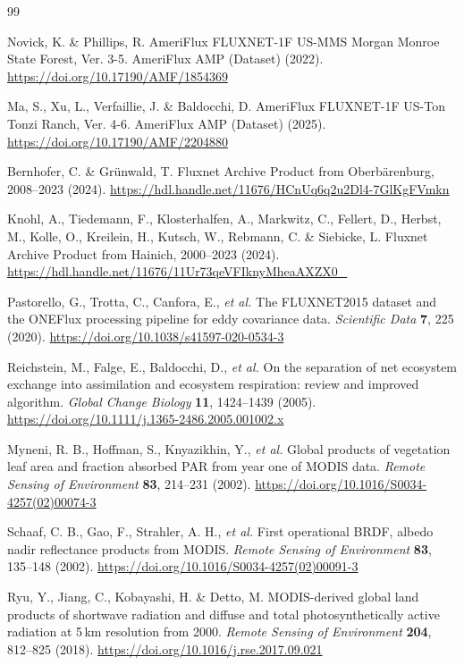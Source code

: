 \begin{thebibliography}{99}

Novick, K. \& Phillips, R.
AmeriFlux FLUXNET-1F US-MMS Morgan Monroe State Forest, Ver. 3-5. AmeriFlux AMP
(Dataset) (2022). \url{https://doi.org/10.17190/AMF/1854369}

Ma, S., Xu, L., Verfaillie, J. \& Baldocchi, D.
AmeriFlux FLUXNET-1F US-Ton Tonzi Ranch, Ver. 4-6. AmeriFlux AMP (Dataset)
(2025). \url{https://doi.org/10.17190/AMF/2204880}

Bernhofer, C. \& Gr\"unwald, T.
Fluxnet Archive Product from Oberb\"arenburg, 2008--2023 (2024).
\url{https://hdl.handle.net/11676/HCnUq6q2u2Dl4-7GlKgFVmkn}

Knohl, A., Tiedemann, F., Klosterhalfen, A., Markwitz, C., Fellert, D.,
Herbst, M., Kolle, O., Kreilein, H., Kutsch, W., Rebmann, C. \& Siebicke, L.
Fluxnet Archive Product from Hainich, 2000--2023 (2024).
\url{https://hdl.handle.net/11676/11Ur73qeVFIknyMheaAXZX0_}

Pastorello, G., Trotta, C., Canfora, E., \emph{et al.}
The FLUXNET2015 dataset and the ONEFlux processing pipeline for eddy covariance
data. \emph{Scientific Data} \textbf{7}, 225 (2020).
\url{https://doi.org/10.1038/s41597-020-0534-3}

Reichstein, M., Falge, E., Baldocchi, D., \emph{et al.}
On the separation of net ecosystem exchange into assimilation and ecosystem
respiration: review and improved algorithm. \emph{Global Change Biology}
\textbf{11}, 1424--1439 (2005).
\url{https://doi.org/10.1111/j.1365-2486.2005.001002.x}

Myneni, R. B., Hoffman, S., Knyazikhin, Y., \emph{et al.}
Global products of vegetation leaf area and fraction absorbed PAR from year one
of MODIS data. \emph{Remote Sensing of Environment} \textbf{83}, 214--231 (2002).
\url{https://doi.org/10.1016/S0034-4257(02)00074-3}

Schaaf, C. B., Gao, F., Strahler, A. H., \emph{et al.}
First operational BRDF, albedo nadir reflectance products from MODIS.
\emph{Remote Sensing of Environment} \textbf{83}, 135--148 (2002).
\url{https://doi.org/10.1016/S0034-4257(02)00091-3}

Ryu, Y., Jiang, C., Kobayashi, H. \& Detto, M.
MODIS-derived global land products of shortwave radiation and diffuse and total
photosynthetically active radiation at 5\,km resolution from 2000.
\emph{Remote Sensing of Environment} \textbf{204}, 812--825 (2018).
\url{https://doi.org/10.1016/j.rse.2017.09.021}


\end{thebibliography}
